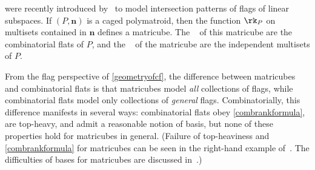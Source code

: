 \begin{rema}
  \label{matricube}
   were recently introduced by~\cite{AG24} to model intersection patterns of flags of linear subspaces.
  If $(P, \mathbf n)$ is a caged polymatroid, then the function $\rk_P$ on multisets contained in $\mathbf n$ defines a matricube.
  The ~\cite[Definition 3.1]{AG24} of this matricube are the combinatorial flats of $P$, and the ~\cite[Definition~5.1]{AG24} of the matricube are the independent multisets of $P$.

  From the flag perspective of \cref{geometryofcf}, the difference between matricubes and combinatorial flats is that matricubes model \emph{all} collections of flags, while combinatorial flats model only collections of \emph{general} flags.
  Combinatorially, this difference manifests in several ways: combinatorial flats obey \cref{combrankformula}, are top-heavy, and admit a reasonable notion of basis, but none of these properties hold for matricubes in general. (Failure of top-heaviness and \cref{combrankformula} for matricubes can be seen in the right-hand example of~\cite[Section 3.1]{AG24}. The difficulties of bases for matricubes are discussed in~\cite[Section 9.1]{AG24}.)
\end{rema}

